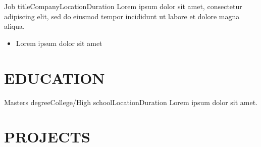 \documentclass[10pt, a4paper]{article}
\begin{document}

\begin{cvitem}{Job title}{Company}{Location}{Duration}
Lorem ipsum dolor sit amet, consectetur adipiscing elit, sed do eiusmod tempor incididunt ut labore et dolore magna aliqua.
    \begin{itemize}
        \item Lorem ipsum dolor sit amet
    \end{itemize}
\end{cvitem}

\section{EDUCATION}


\begin{cvitem}{Masters degree}{College/High school}{Location}{Duration}
    Lorem ipsum dolor sit amet.
\end{cvitem}




\section{PROJECTS}
\end{document}
